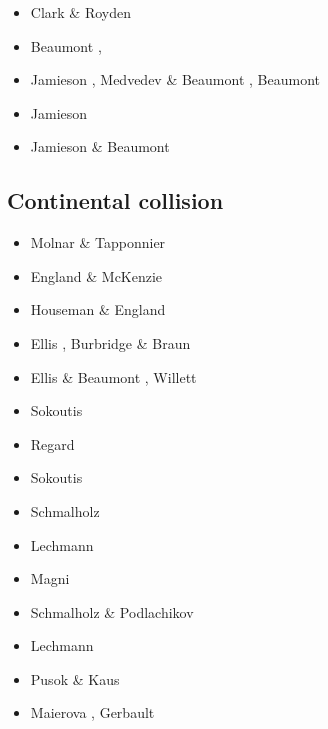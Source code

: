 \begin{scriptsize}
\begin{itemize}
\item[\twothousand] Clark \& Royden \cite{clro00}
\item[\twothousandfour] Beaumont \etal \cite{bejn04}, \cite{jabm04}
\item[\twothousandsix] Jamieson \etal \cite{jabn06}, Medvedev \& Beaumont \cite{mebe06}, 
                        Beaumont \etal \cite{benj06}
\item[\twothousandseven] Jamieson \etal \cite{jabn07}
\item[\twothousandeleven] Jamieson \& Beaumont \cite{jabe11}
\end{itemize}
\end{scriptsize}

\subsection*{Continental collision} 

\begin{scriptsize}
\begin{itemize}
\item[\nineteenseventyfive] Molnar \& Tapponnier \cite{mota75}
\item[\nineteeneightytwo] England \& McKenzie \cite{enmc82} 
\item[\nineteeneightysix] Houseman \& England \cite{hoen86a}
\item[\nineteenninetyeight] Ellis \etal \cite{elbj98}, Burbridge \& Braun \cite{bubr98}
\item[\nineteenninetynine] Ellis \& Beaumont \cite{elbe99}, Willett \cite{will99b}
\item[\twothousand] Sokoutis \etal \cite{sobm00}
\item[\twothousandthree] Regard \etal \cite{refm03}
\item[\twothousandfive] Sokoutis \etal \cite{sobb05}
\item[\twothousandnine] Schmalholz \etal \cite{sckb09}
\item[\twothousandeleven] Lechmann \etal \cite{lemk11}
\item[\twothousandtwelve] Magni \etal \cite{mavf12}
\item[\twothousandthirteen] Schmalholz \& Podlachikov \cite{scpo13}
\item[\twothousandfourteen] Lechmann \etal \cite{lesh14}
\item[\twothousandfifteen] Pusok \& Kaus \cite{puka15}
\item[\twothousandeighteen] Maierova \etal \cite{masg18}, Gerbault \etal \cite{gesr18}
\end{itemize}
\end{scriptsize}

